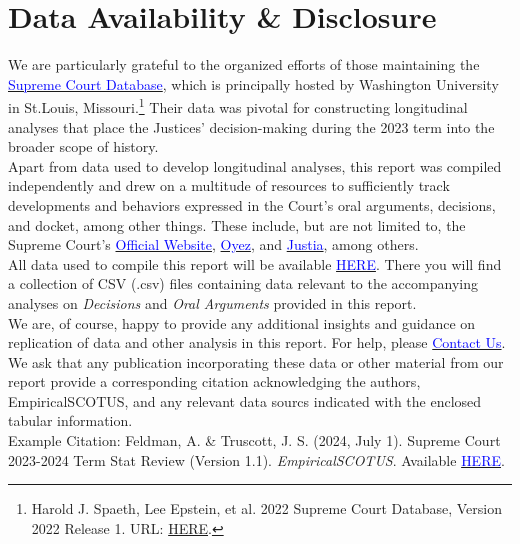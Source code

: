 \newpage

\section{Data Availability \& Disclosure}

\noindent We are particularly grateful to the organized efforts of those maintaining the \href{http://scdb.wustl.edu/}{\textcolor{blue}{Supreme Court Database}}, which is principally hosted by Washington University in St.Louis, Missouri.\footnote{Harold J. Spaeth, Lee Epstein, et al. 2022 Supreme Court Database, Version 2022 Release 1. URL: \href{http://Supremecourtdatabase.org}{HERE}. } Their data was pivotal for constructing longitudinal analyses that place the Justices' decision-making during the 2023 term into the broader scope of history. \\

\noindent Apart from data used to develop longitudinal analyses, this report was compiled independently and drew on a multitude of resources to sufficiently track developments and behaviors expressed in the Court's oral arguments, decisions, and docket, among other things. These include, but are not limited to, the Supreme Court's \href{https://www.supremecourt.gov/}{\textcolor{blue}{Official Website}}, \href{https://www.oyez.org/}{\textcolor{blue}{Oyez}}, and \href{https://www.justia.com/}{\textcolor{blue}{Justia}}, among others. \\

\noindent All data used to compile this report will be available \href{https://empiricalscotus.com/2023-stats/}{\textcolor{blue}{HERE}}. There you will find a collection of CSV (.csv) files containing data relevant to the accompanying analyses on \emph{Decisions} and \emph{Oral Arguments} provided in this report. \\

\noindent We are, of course, happy to provide any additional insights and guidance on replication of data and other analysis in this report. For help, please \href{mailto:adam@feldmannet.com}{\textcolor{blue}{Contact Us}}. \\

\noindent We ask that any publication incorporating these data or other material from our report provide a corresponding citation acknowledging the authors, EmpiricalSCOTUS, and any relevant data sourcs indicated with the enclosed tabular information. \\

\noindent Example Citation: Feldman, A. \& Truscott, J. S. (2024, July 1). Supreme Court 2023-2024 Term Stat Review (Version 1.1). \emph{EmpiricalSCOTUS}. Available \href{https://empiricalscotus.com/}{\textcolor{blue}{HERE}}.
